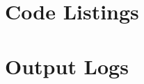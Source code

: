 \documentclass[a4paper,titlepage]{article}
\begin{document}
	\begin{appendices}
		
		\section{Code Listings} \label{appendix:code}
		
		
		
		\section{Output Logs} \label{appendix:logs}
		

	\end{appendices}
\end{document}

